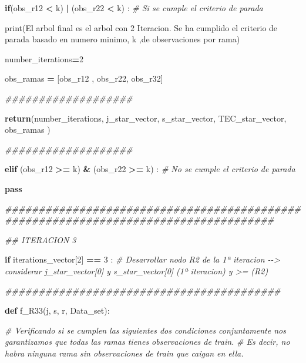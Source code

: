 \documentclass[
  11pt,
  a4paper,
]{article}
\newenvironment{Shaded}{\begin{snugshade}}{\end{snugshade}}
\newcommand{\BuiltInTok}[1]{#1}
\newcommand{\CommentTok}[1]{\textcolor[rgb]{0.56,0.35,0.01}{\textit{#1}}}
\newcommand{\ControlFlowTok}[1]{\textcolor[rgb]{0.13,0.29,0.53}{\textbf{#1}}}
\newcommand{\DecValTok}[1]{\textcolor[rgb]{0.00,0.00,0.81}{#1}}
\newcommand{\KeywordTok}[1]{\textcolor[rgb]{0.13,0.29,0.53}{\textbf{#1}}}
\newcommand{\NormalTok}[1]{#1}
\newcommand{\OperatorTok}[1]{\textcolor[rgb]{0.81,0.36,0.00}{\textbf{#1}}}
\newcommand{\StringTok}[1]{\textcolor[rgb]{0.31,0.60,0.02}{#1}}
\begin{document}
\begin{Shaded}
\begin{Highlighting}[]
        \ControlFlowTok{if}\NormalTok{(obs\_r12 }\OperatorTok{\textless{}}\NormalTok{ k) }\OperatorTok{|}\NormalTok{ (obs\_r22 }\OperatorTok{\textless{}}\NormalTok{ k) : }\CommentTok{\# Si se cumple el criterio de parada}


            \BuiltInTok{print}\NormalTok{(}\StringTok{\textquotesingle{}El arbol final es el arbol con 2 Iteracion. Se ha cumplido el criterio de parada basado en numero minimo\textquotesingle{}}\NormalTok{, k ,}\StringTok{\textquotesingle{}de observaciones por rama\textquotesingle{}}\NormalTok{)}

\NormalTok{            number\_iterations}\OperatorTok{=}\DecValTok{2}
            
\NormalTok{            obs\_ramas }\OperatorTok{=}\NormalTok{ [obs\_r12 , obs\_r22, obs\_r32]}

        
            \CommentTok{\#\#\#\#\#\#\#\#\#\#\#\#\#\#\#\#\#\#\#}
            
            \ControlFlowTok{return}\NormalTok{(number\_iterations, j\_star\_vector, s\_star\_vector, TEC\_star\_vector, obs\_ramas ) }

            \CommentTok{\#\#\#\#\#\#\#\#\#\#\#\#\#\#\#\#\#\#\#}


        \ControlFlowTok{elif}\NormalTok{ (obs\_r12 }\OperatorTok{\textgreater{}=}\NormalTok{ k) }\OperatorTok{\&}\NormalTok{ (obs\_r22 }\OperatorTok{\textgreater{}=}\NormalTok{ k) : }\CommentTok{\# No se cumple el criterio de parada}

            \ControlFlowTok{pass}



\CommentTok{\#\#\#\#\#\#\#\#\#\#\#\#\#\#\#\#\#\#\#\#\#\#\#\#\#\#\#\#\#\#\#\#\#\#\#\#\#\#\#\#\#\#\#\#\#\#\#\#\#\#\#\#\#\#\#\#\#\#\#\#\#\#\#\#\#\#\#\#\#\#\#\#\#\#\#\#\#\#\#\#\#\#\#\#}

\CommentTok{\#\# ITERACION 3}

    \ControlFlowTok{if}\NormalTok{ iterations\_vector[}\DecValTok{2}\NormalTok{] }\OperatorTok{==} \DecValTok{3}\NormalTok{ :  }\CommentTok{\# Desarrollar nodo R2 de la 1ª iteracion {-}{-}\textgreater{}  considerar j\_star\_vector[0] y s\_star\_vector[0] (1ª iteracion) y \textgreater{}= (R2)}

       \CommentTok{\#\#\#\#\#\#\#\#\#\#\#\#\#\#\#\#\#\#\#\#\#\#\#\#\#\#\#\#\#\#\#\#\#\#\#\#\#\#\#\#\#}

        \KeywordTok{def}\NormalTok{ f\_R33(j, s, r, Data\_set):}

           \CommentTok{\# Verificando si se cumplen las siguientes dos condiciones conjuntamente nos garantizamos que todas las ramas tienes observaciones de train. }
           \CommentTok{\# Es decir, no habra ninguna rama sin observaciones de train que caigan en ella.}


\end{Highlighting}
\end{Shaded}
\end{document}
